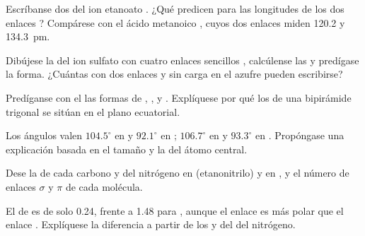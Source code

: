 \begin{exercise}[$\star\star$]\label{exo:b1:lewis-resonance-vsepr:5}
Escríbanse dos  del ion etanoato . ¿Qué
predicen para las longitudes de los dos enlaces ? Compárese con
el ácido metanoico , cuyos dos enlaces  miden 120.2 y
\qty{134.3}{pm}.
\end{exercise}

\begin{exercise}[$\star\star$]\label{exo:b1:lewis-resonance-vsepr:6}
Dibújese la  del ion sulfato  con cuatro
enlaces sencillos , calcúlense las  y predígase la
forma. ¿Cuántas  con dos enlaces  y sin carga
en el azufre pueden escribirse?
\end{exercise}

\begin{exercise}[$\star\star$]\label{exo:b1:lewis-resonance-vsepr:7}
Predíganse con el  las formas de , ,
 y . Explíquese por qué los  de una
bipirámide trigonal se sitúan en el plano ecuatorial.
\end{exercise}

\begin{exercise}[$\star\star$]\label{exo:b1:lewis-resonance-vsepr:8}
Los ángulos  valen $104.5^\circ$ en  y $92.1^\circ$ en
; $106.7^\circ$ en  y $93.3^\circ$ en .
Propóngase una explicación basada en el tamaño y la 
del átomo central.
\end{exercise}

\begin{exercise}[$\star\star$]\label{exo:b1:lewis-resonance-vsepr:9}
Dese la  de cada carbono y del nitrógeno en 
(etanonitrilo) y en , y el número de enlaces $\sigma$ y
$\pi$ de cada molécula.
\end{exercise}

\begin{exercise}[$\star\star\star$]\label{exo:b1:lewis-resonance-vsepr:10}
El  de  es de solo \qty{0.24}{\debye}, frente a
\qty{1.48}{\debye} para , aunque el enlace  es más polar
que el enlace . Explíquese la diferencia a partir de los  y del  del nitrógeno.
\end{exercise}

